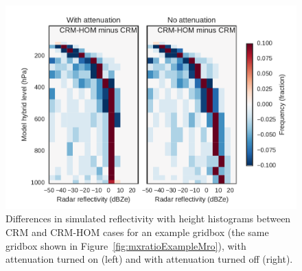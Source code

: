 \begin{figure}[htbp]
\centering
\includegraphics{graphics/subgrid1_cfadDbze94_att-test.pdf}
\caption{\label{fig:cfadTestatt}Differences in simulated reflectivity
with height histograms between CRM and CRM-HOM cases for an example
gridbox (the same gridbox shown in Figure~\ref{fig:mxratioExampleMro}),
with attenuation turned on (left) and with attenuation turned off
(right).}\label{fig:cfadTestatt}
\end{figure}

